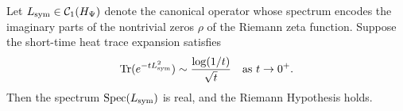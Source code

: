 \begin{theorem}
\label{thm:heat_trace_rigidity}
Let $L_{\mathrm{sym}} \in \mathcal{C}_1(H_{\Psi})$ denote the canonical operator whose spectrum encodes the imaginary parts of the nontrivial zeros $\rho$ of the Riemann zeta function. Suppose the short-time heat trace expansion satisfies
\[
\operatorname{Tr}(e^{-t L_{\mathrm{sym}}^2}) \sim \frac{\log(1/t)}{\sqrt{t}} \quad \text{as } t \to 0^+.
\]
Then the spectrum $\operatorname{Spec}(L_{\mathrm{sym}})$ is real, and the Riemann Hypothesis holds.
\end{theorem}
